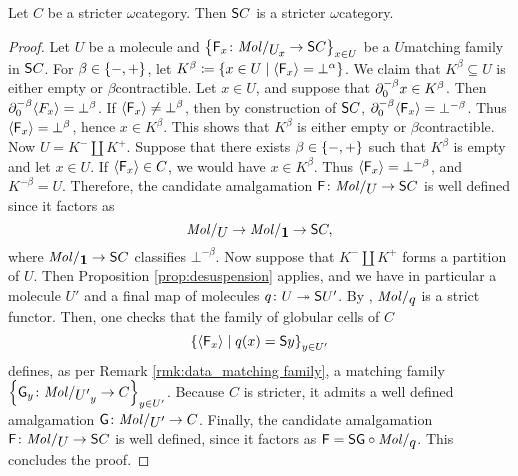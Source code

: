 \begin{thm} \label{thm:suspension_of_stricter}
    Let \( C \) be a stricter \( \omega \)\nbd category.
    Then \( \mathsf{S}{C} \) is a stricter \( \omega \)\nbd category.
\end{thm}
\begin{proof}
    Let \( U \) be a molecule and \( \set{\F_x \colon \molecin{\imel{U}{x}} \to \sus{C}}_{x \in U} \) be a \( U \)\nbd matching family in \( \mathsf{S}{C} \).
    For \( \beta \in \left\{ {-, +} \right\} \), let \( K^\beta \coloneqq \left\{ {x \in U \mid \langle\mathsf{F}_x\rangle = \bot^\alpha} \right\} \).
    We claim that \( K^\beta \subseteq U \) is either empty or \( \beta \)\nbd contractible.
    Let \( x \in U \), and suppose that \( \partial_{0}^{-\beta} x \in K^\beta \).
    Then \( \partial_{0}^{-\beta} \langle F_x\rangle = \bot^{\beta} \).
    If \( \langle\mathsf{F}_x\rangle \neq \bot^\beta \), then by construction of \( \mathsf{S}{C} \), \( \partial_{0}^{-\beta} \langle\mathsf{F}_x\rangle = \bot^{-\beta} \).
    Thus \( \langle\mathsf{F}_x\rangle = \bot^\beta \), hence \( x \in K^\beta \).
    This shows that \( K^\beta \) is either empty or \( \beta \)\nbd contractible.
    Now \( U = K^- \coprod K^+ \).
    Suppose that there exists \( \beta \in \left\{ {-, +} \right\} \) such that \( K^\beta \) is empty and let \( x \in U \).
    If \( \langle\mathsf{F}_x\rangle \in C \), we would have \( x \in K^\beta \).
    Thus \( \langle\mathsf{F}_x\rangle = \bot^{-\beta} \), and \( K^{-\beta} = U \).
    Therefore, the candidate amalgamation \( \F \colon \molecin{U} \to \sus{C} \) is well defined since it factors as
    \begin{equation*}
        \molecin{U} \to \molecin{\pt} \to \sus{C},
    \end{equation*}
    where \( \molecin{\pt} \to \sus{C} \) classifies \( \bot^{-\beta} \).
    Now suppose that \( K^- \coprod K^+ \) forms a partition of \( U \).
    Then Proposition \ref{prop:desuspension} applies, and we have in particular a molecule \( U' \) and a final map of molecules \( q \colon U \twoheadrightarrow \mathsf{S}{U'} \). 
    By \cite[Theorem 6.2.35]{hadzihasanovic2024combinatorics}, \( \molecin{q} \) is a strict functor.
    Then, one checks that the family of globular cells of \( C \)
    \begin{equation*}
        \left\{ {\langle\mathsf{F}_x\rangle \mid q(x) = \mathsf{S}{y}} \right\}_{y \in U'}
    \end{equation*} 
    defines, as per Remark \ref{rmk:data_matching family}, a matching family \( \set{\G_y \colon \molecin{\imel{U'}{y}} \to C}_{y \in U'} \).
    Because \( C \) is stricter, it admits a well defined amalgamation \( \G \colon \molecin{U'} \to C \).
    Finally, the candidate amalgamation \( \F \colon \molecin{U} \to \sus{C} \) is well defined, since it factors as \( \F = \sus{\G} \after \molecin{q} \).
    This concludes the proof.
\end{proof}

